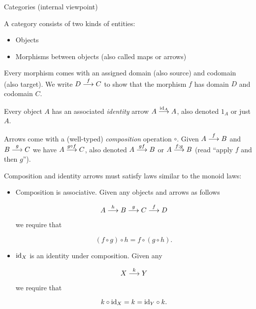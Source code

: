 \begin{definition} Categories (internal viewpoint)

  A category consists of two kinds of entities:
  \begin{itemize}
  \item Objects
  \item Morphisms between objects (also called maps or arrows)
  \end{itemize}

  Every morphism comes with an assigned domain (also source) and codomain (also
  target). We write $D \overset{f}{\longrightarrow} C$ to show that the morphism $f$ has domain
  $D$ and codomain $C$.

  Every object $A$ has an associated \emph{identity} arrow $A \overset{\mathrm{id}_{ A }}{\longrightarrow}
  A$, also denoted $1_A$ or just $A$.

  Arrows come with a (well-typed) \emph{composition} operation $\circ$. Given
  $A \overset{f}{\longrightarrow} B$ and $B \overset{g}{\longrightarrow} C$ we have $A \overset{g \circ f}{\longrightarrow} C$,
  also denoted $A \overset{gf}{\longrightarrow} B$ or $A \overset{f;g}{\longrightarrow} B$ (read ``apply $f$ and
  then $g$'').

  Composition and identity arrows must satisfy laws similar to the monoid laws:

  \begin{itemize}
  \item Composition is associative. Given any objects and arrows as follows

    \[A \overset{h}{\longrightarrow} B \overset{g}{\longrightarrow} C \overset{f}{\longrightarrow} D\]

    we require that

    \[(f \circ g) \circ h = f \circ (g \circ h).\]

  \item $\mathrm{id}_{ X }$ is an identity under composition. Given any

    \[X \overset{k}{\longrightarrow} Y\]

    we require that

    \[k \circ \mathrm{id}_{ X } = k = \mathrm{id}_{ Y } \circ k .\]
  \end{itemize}
\end{definition}

